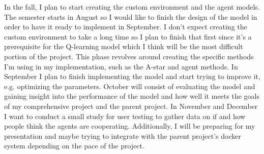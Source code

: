 \documentclass[10pt,twocolumn]{article}
\begin{document}
In the fall, I plan to start creating the custom environment and the agent models.
The semester starts in August so I would like to finish the design of the model in order to have it ready to implement in September.
I don't expect creating the custom environment to take a long time so I plan to finish that first since it's a prerequisite for the Q-learning model which I think will be the most difficult portion of the project.
This phase revolves around creating the specific methods I'm using in my implementation, such as the A-star and agent methods.
In September I plan to finish implementing the model and start trying to improve it, e.g. optimizing the parameters.
October will consist of evaluating the model and gaining insight into the performance of the model and how well it meets the goals of my comprehensive project and the parent project.
In November and December I want to conduct a small study for user testing to gather data on if and how people think the agents are cooperating.
Additionally, I will be preparing for my presentation and maybe trying to integrate with the parent project's docker system depending on the pace of the project.

\printbibliography
\end{document}
